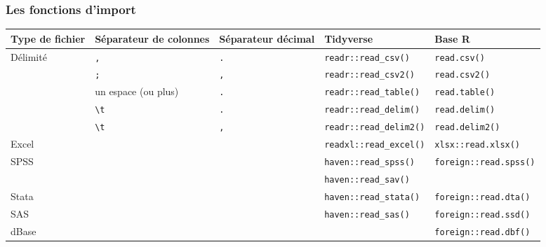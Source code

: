 \documentclass[
  french,
  10pt,
  a4paper,
]{article}
\newcounter{none} %
\begin{document}
\subsubsection{Les fonctions d'import}\label{les-fonctions-dimport}

{\def\LTcaptype{none} %
\begin{longtable}[]{@{}
  >{\raggedright\arraybackslash}p{}
  >{\raggedright\arraybackslash}p{}
  >{\raggedright\arraybackslash}p{}
  >{\raggedright\arraybackslash}p{}
  >{\raggedright\arraybackslash}p{}@{}}
\toprule\noalign{}
\begin{minipage}[b]{\linewidth}\raggedright
Type de fichier
\end{minipage} & \begin{minipage}[b]{\linewidth}\raggedright
Séparateur de colonnes
\end{minipage} & \begin{minipage}[b]{\linewidth}\raggedright
Séparateur décimal
\end{minipage} & \begin{minipage}[b]{\linewidth}\raggedright
Tidyverse
\end{minipage} & \begin{minipage}[b]{\linewidth}\raggedright
Base R
\end{minipage} \\
\midrule\noalign{}
\endhead
\bottomrule\noalign{}
\endlastfoot
Délimité & \texttt{,} & \texttt{.} & \texttt{readr::read\_csv()} &
\texttt{read.csv()} \\
& \texttt{;} & \texttt{,} & \texttt{readr::read\_csv2()} &
\texttt{read.csv2()} \\
& un espace (ou plus) & \texttt{.} & \texttt{readr::read\_table()} &
\texttt{read.table()} \\
& \texttt{\textbackslash{}t} & \texttt{.} &
\texttt{readr::read\_delim()} & \texttt{read.delim()} \\
& \texttt{\textbackslash{}t} & \texttt{,} &
\texttt{readr::read\_delim2()} & \texttt{read.delim2()} \\
Excel & & & \texttt{readxl::read\_excel()} &
\texttt{xlsx::read.xlsx()} \\
SPSS & & & \texttt{haven::read\_spss()} &
\texttt{foreign::read.spss()} \\
& & & \texttt{haven::read\_sav()} & \\
Stata & & & \texttt{haven::read\_stata()} &
\texttt{foreign::read.dta()} \\
SAS & & & \texttt{haven::read\_sas()} & \texttt{foreign::read.ssd()} \\
dBase & & & & \texttt{foreign::read.dbf()} \\
\end{longtable}
}
\end{document}
